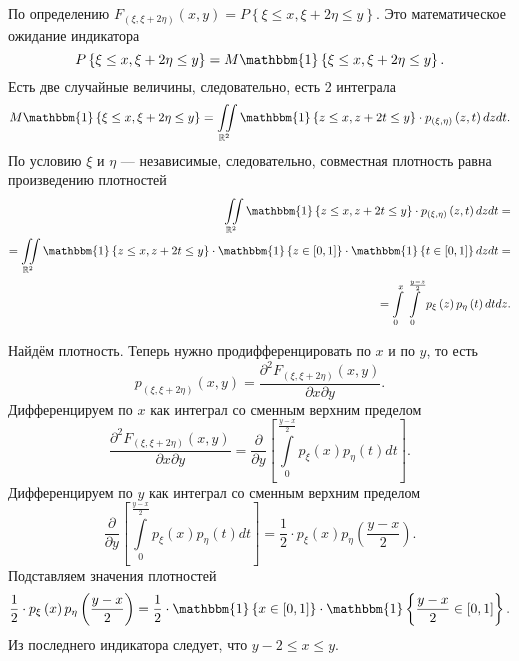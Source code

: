 \begin{enumerate}[label=\alph*)]
  По определению
  $F_{ \left( \xi, \xi + 2 \eta \right) } \left( x, y \right) =
    P \left\{ \xi \leq x, \xi + 2 \eta \leq y \right\} $.
  Это математическое ожидание индикатора
  $$P \left\{ \xi \leq x, \xi + 2 \eta \leq y \right\} =
    M \mathbbm{1} \left\{ \xi \leq x, \xi + 2 \eta \leq y \right\}.$$
  Есть две случайные величины, следовательно, есть 2 интеграла
  $$M \mathbbm{1} \left\{ \xi \leq x, \xi + 2 \eta \leq y \right\} =
    \iint \limits_{ \mathbb{R}^2}
      \mathbbm{1} \left\{ z \leq x, z + 2t \leq y \right\} \cdot
      p_{ \left( \xi, \eta \right) } \left( z, t \right)
    dzdt.$$
  По условию $ \xi $ и $ \eta $ --- независимые, следовательно,
  совместная плотность равна произведению плотностей
  \begin{equation*}
    \begin{split}
      \iint \limits_{ \mathbb{R}^2}
        \mathbbm{1} \left\{ z \leq x, z + 2t \leq y \right\} \cdot
        p_{ \left( \xi, \eta \right) } \left( z, t \right)
      dzdt = \\
      = \iint \limits_{ \mathbb{R}^2}
        \mathbbm{1} \left\{ z \leq x, z + 2t \leq y \right\} \cdot
        \mathbbm{1} \left\{ z \in \left[ 0, 1 \right] \right\} \cdot
        \mathbbm{1} \left\{ t \in \left[ 0, 1 \right] \right\}
      dzdt = \\
      = \int \limits_0^x
        \int \limits_0^{ \frac{y - z}{2}} p_{ \xi } \left( z \right) p_{ \eta } \left( t \right) dt
      dz.
    \end{split}
  \end{equation*}

  Найдём плотность.
  Теперь нужно продифференцировать по $x$ и по $y$, то есть
  $$p_{ \left( \xi, \xi + 2 \eta \right) } \left( x, y \right) =
    \frac{ \partial^2 F_{ \left( \xi, \xi + 2 \eta \right) } \left( x, y \right) }{ \partial x \partial y}.$$
  Дифференцируем по $x$ как интеграл со сменным верхним пределом
  $$ \frac{ \partial^2 F_{ \left( \xi, \xi + 2 \eta \right) } \left( x, y \right) }{ \partial x \partial y} =
    \frac{ \partial }{ \partial y} \left[
      \int \limits_0^{ \frac{y - x}{2}} p_{ \xi } \left( x \right) p_{ \eta } \left( t \right) dt
    \right].$$
  Дифференцируем по $y$ как интеграл со сменным верхним пределом
  $$ \frac{ \partial }{ \partial y} \left[
      \int \limits_0^{ \frac{y - x}{2}} p_{ \xi } \left( x \right) p_{ \eta } \left( t \right) dt
    \right] =
    \frac{1}{2} \cdot p_{ \xi } \left( x \right) p_{ \eta } \left( \frac{y - x}{2} \right).$$
  Подставляем значения плотностей
  $$ \frac{1}{2} \cdot p_{ \xi } \left( x \right) p_{ \eta } \left( \frac{y - x}{2} \right) =
    \frac{1}{2} \cdot
    \mathbbm{1} \left\{ x \in \left[ 0, 1 \right] \right\} \cdot
    \mathbbm{1} \left\{ \frac{y - x}{2} \in \left[ 0, 1 \right] \right\}.$$
  Из последнего индикатора следует, что $y - 2 \leq x \leq y$.


\end{enumerate}
